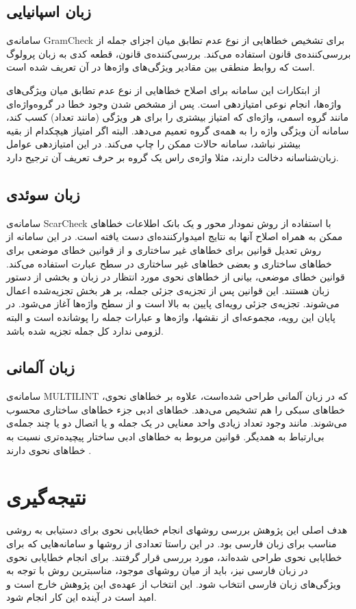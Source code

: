 \documentclass{report}
\begin{document}
\subsection{زبان اسپانیایی}
سامانه‌ی GramCheck \cite{ct3} برای تشخیص خطاهایی از نوع عدم تطابق میان اجزای جمله از بررسی‌کننده‌ی قانون استفاده می‌کند. بررسی‌کننده‌ی قانون، قطعه کدی به زبان پرولوگ است که روابط منطقی بین مقادیر ویژگی‌های واژه‌ها در آن تعریف شده است.

از ابتکارات این سامانه برای اصلاح خطاهایی از نوع عدم تطابق میان ویژگی‌های واژه‌ها، انجام نوعی امتیازدهی است. پس از مشخص شدن وجود خطا در گروه‌واژه‌ای مانند گروه اسمی، واژه‌ای که امتیاز بیشتری را برای هر ویژگی (مانند تعداد) کسب کند، سامانه آن ویژگی واژه را به همه‌ی گروه تعمیم می‌دهد. البته اگر امتیاز هیچکدام از بقیه بیشتر نباشد، سامانه حالات ممکن را چاپ می‌کند. در این امتیازدهی عوامل زبان‌شناسانه دخالت دارند، مثلا واژه‌ی راس یک گروه بر حرف تعریف آن ترجیح دارد. 

\subsection{زبان سوئدی}
سامانه‌ی ScarCheck \cite{ct22} با استفاده از روش نمودار محور و یک بانک اطلاعات خطاهای ممکن به همراه اصلاح آنها به نتایج امیدوارکننده‌ای دست یافته‌ است. در این سامانه از روش تعدیل قوانین برای خطاهای غیر ساختاری و از قوانین خطای موضعی برای خطاهای ساختاری و بعضی خطاهای غیر ساختاری در سطح عبارت استفاده می‌کند.
قوانین خطای موضعی، بیانی از خطاهای نحوی مورد انتظار در زبان و بخشی از دستور زبان هستند. این قوانین پس از تجزیه‌ی جزئی جمله، بر هر بخش تجزیه‌شده اعمال می‌شوند. تجزیه‌ی جزئی رویه‌ای پایین به بالا است و از سطح واژه‌ها آغاز می‌شود. در پایان این رویه، مجموعه‌ای از نقشها، واژه‌ها و عبارات جمله را پوشانده است و البته لزومی ندارد کل جمله تجزیه شده باشد.

\subsection{زبان آلمانی}
سامانه‌ی MULTILINT که در زبان آلمانی طراحی شده‌است، علاوه بر خطاهای نحوی، خطاهای سبکی را هم تشخیص می‌دهد. خطاهای ادبی جزء خطاهای ساختاری محسوب می‌شوند. مانند وجود تعداد زیادی واحد معنایی در یک جمله و یا اتصال دو یا چند جمله‌ی بی‌ارتباط به همدیگر. قوانین مربوط به خطاهای ادبی ساختار پیچیده‌تری نسبت به خطاهای نحوی دارند \cite{ct23}.

\section{نتیجه‌گیری}
هدف اصلی این پژوهش بررسی روشهای انجام خطایابی نحوی برای دستیابی به روشی مناسب برای زبان فارسی بود. در این راستا  تعدادی از روشها و سامانه‌هایی که برای خطایابی نحوی طراحی شده‌اند، مورد بررسی قرار گرفتند. برای انجام خطایابی نحوی در زبان فارسی نیز، باید از میان روشهای موجود، مناسبترین روش با توجه به ویژگی‌های زبان فارسی انتخاب شود. این انتخاب از عهده‌ی این پژوهش خارج است و امید است در آینده این کار انجام شود. 
\end{document}
